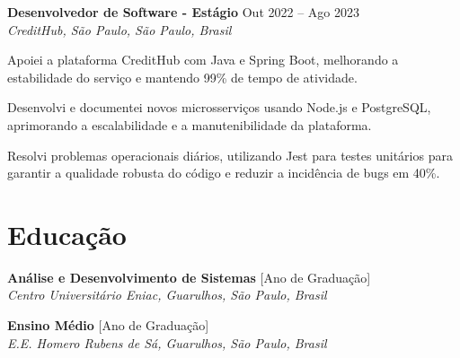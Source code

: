\documentclass[11pt,letterpaper]{article}
\begin{document}
\textbf{Desenvolvedor de Software - Estágio} \hfill Out 2022 – Ago 2023 \\
\textit{CreditHub, São Paulo, São Paulo, Brasil}
\begin{achievements}
    \item Apoiei a plataforma CreditHub com Java e Spring Boot, melhorando a estabilidade do serviço e mantendo 99\% de tempo de atividade.
    \item Desenvolvi e documentei novos microsserviços usando Node.js e PostgreSQL, aprimorando a escalabilidade e a manutenibilidade da plataforma.
    \item Resolvi problemas operacionais diários, utilizando Jest para testes unitários para garantir a qualidade robusta do código e reduzir a incidência de bugs em 40\%.
\end{achievements}

\section{Educação}
\textbf{Análise e Desenvolvimento de Sistemas} \hfill [Ano de Graduação] \\
\textit{Centro Universitário Eniac, Guarulhos, São Paulo, Brasil}

\textbf{Ensino Médio} \hfill [Ano de Graduação] \\
\textit{E.E. Homero Rubens de Sá, Guarulhos, São Paulo, Brasil}
\end{document}
